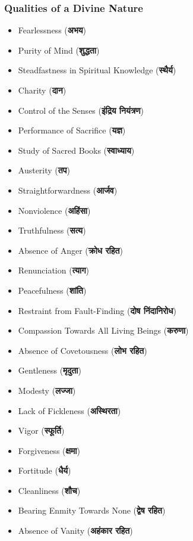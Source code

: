 \begin{frame}[fragile]\frametitle{Qualities of a Divine Nature}
    \begin{itemize}
        \item Fearlessness (\textbf{अभय})
        \item Purity of Mind (\textbf{शुद्धता})
        \item Steadfastness in Spiritual Knowledge (\textbf{स्थैर्य})
        \item Charity (\textbf{दान})
        \item Control of the Senses (\textbf{इंद्रिय नियंत्रण})
        \item Performance of Sacrifice (\textbf{यज्ञ})
        \item Study of Sacred Books (\textbf{स्वाध्याय})
        \item Austerity (\textbf{तप})
        \item Straightforwardness (\textbf{आर्जव})
        \item Nonviolence (\textbf{अहिंसा})
        \item Truthfulness (\textbf{सत्य})
        \item Absence of Anger (\textbf{क्रोध रहित})
        \item Renunciation (\textbf{त्याग})
        \item Peacefulness (\textbf{शांति})
        \item Restraint from Fault-Finding (\textbf{दोष निंदानिरोध})
        \item Compassion Towards All Living Beings (\textbf{करुणा})
        \item Absence of Covetousness (\textbf{लोभ रहित})
        \item Gentleness (\textbf{मृदुता})
        \item Modesty (\textbf{लज्जा})
        \item Lack of Fickleness (\textbf{अस्थिरता})
        \item Vigor (\textbf{स्फूर्ति})
        \item Forgiveness (\textbf{क्षमा})
        \item Fortitude (\textbf{धैर्य})
        \item Cleanliness (\textbf{शौच})
        \item Bearing Enmity Towards None (\textbf{द्वेष रहित})
        \item Absence of Vanity (\textbf{अहंकार रहित})
    \end{itemize}
\end{frame}


